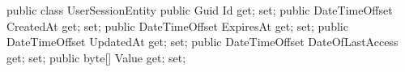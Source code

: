 \begin{spverbatim}
    public class UserSessionEntity
    {
        public Guid Id { get; set; }
        public DateTimeOffset CreatedAt { get; set; }
        public DateTimeOffset ExpiresAt { get; set; }
        public DateTimeOffset UpdatedAt { get; set; }
        public DateTimeOffset DateOfLastAccess { get; set; }
        public byte[] Value { get; set; }
    }
\end{spverbatim}